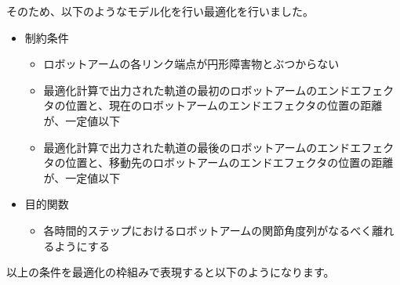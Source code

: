 そのため、以下のようなモデル化を行い最適化を行いました。

\begin{itemize}
  \item 制約条件
  \begin{itemize}
    \item ロボットアームの各リンク端点が円形障害物とぶつからない
    \item 最適化計算で出力された軌道の最初のロボットアームのエンドエフェクタの位置と、現在のロボットアームのエンドエフェクタの位置の距離が、一定値以下
    \item 最適化計算で出力された軌道の最後のロボットアームのエンドエフェクタの位置と、移動先のロボットアームのエンドエフェクタの位置の距離が、一定値以下
  \end{itemize}

  \item 目的関数
    \begin{itemize}
      \item 各時間的ステップにおけるロボットアームの関節角度列がなるべく離れるようにする
    \end{itemize}
\end{itemize}

以上の条件を最適化の枠組みで表現すると以下のようになります。


